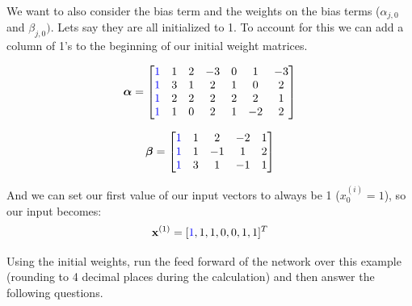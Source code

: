 \documentclass[11pt,addpoints,answers]{exam}
\newcommand{\xv}{\mathbf{x}}
\begin{document}
\begin{questions}
We want to also consider the bias term and the weights on the bias terms (${\alpha}_{j,0}$ and ${\beta}_{j,0})$. Lets say they are all initialized to 1. To account for this we can add a column of 1's to the beginning of our initial weight matrices. 

$$\boldsymbol{\alpha}=
    \begin{bmatrix}
    \textcolor{blue}{1} & 1 & 2 & -3 & 0 & 1 & -3 \\
    \textcolor{blue}{1} & 3 & 1 & 2 & 1 & 0 & 2 \\
    \textcolor{blue}{1} & 2 & 2 & 2 & 2 & 2 & 1 \\
    \textcolor{blue}{1} & 1 & 0 & 2 & 1 & -2 & 2
    \end{bmatrix}$$
    
$$\boldsymbol{\beta}=
    \begin{bmatrix}
    \textcolor{blue}{1} & 1 & 2 & -2 & 1 \\
    \textcolor{blue}{1} & 1 & -1 & 1 & 2 \\
    \textcolor{blue}{1} & 3 & 1 & -1 & 1
    \end{bmatrix}
$$

And we can set our first value of our input vectors to always be 1 ($x_0^{(i)} = 1$), so our input becomes: $$\xv^{(1)}=[\textcolor{blue}{1},1,1,0,0,1,1]^T$$

 Using the initial weights, run the feed forward of the network over this example (rounding to 4 decimal places during the calculation) and then answer the following questions. 
 
\clearpage
{}
\end{questions}
\end{document}
